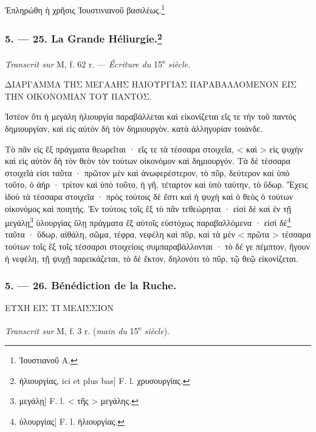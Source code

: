 \documentclass[a4paper, 11pt, oneside, polutonikogreek, french]{article}
\begin{document}
Ἑπληρώθη ἡ χρῆσις Ἰουστινιανοῦ βασιλέως.\footnote{Ἰουστιανοῦ A.}

\bigskip
\centerline{\EightStarTaper}
\centerline{\EightStarTaper\EightStarTaper}
\bigskip

\subsubsection[5. --- 25. La Grande Héliurgie.]{5. --- 25. La Grande Héliurgie.\footnote{ἡλιουργίας, ici et plus bas] F. l. χρυσουργίας.}}

\emph{Transcrit sur} M, f. 62 r. --- \emph{Écriture du} 15\textsuperscript{e} \emph{siècle.}

\bigskip

ΔΙΑΡΓΑΜΜΑ ΤΗΣ ΜΕΓΑΛΗΣ ΗΛΙΟΥΡΓΙΑΣ ΠΑΡΑΒΑΛΛΟΜΕΝΟΝ ΕΙΣ ΤΗΝ ΟΙΚΟΝΟΜΙΑΝ ΤΟΥ ΠΑΝΤΟΣ.

Ἰστέον ὅτι ἡ μεγάλη ἡλιουργία παραβάλλεται καὶ εἰκονίζεται εἴς τε τὴν τοῦ παντὸς δημιουργίαν, καὶ εἰς αὐτὸν δὴ τὸν δημιουργὸν, κατὰ ἀλληγορίαν τοιάνδε.

Τὸ πᾶν εἰς ἓξ πράγματα θεωρεῖται · εἴς τε τὰ τέσσαρα στοιχεῖα, < καὶ > εἰς ψυχὴν καὶ εἰς αὐτὸν δὴ τὸν θεὸν τὸν τούτων οἰκονόμον καὶ δημιουργόν. Τὰ δὲ τέσσαρα στοιχεῖά εἰσι ταῦτα · πρῶτον μὲν καὶ ἀνωφερέστερον, τὸ πῦρ, δεύτερον καὶ ὑπὸ τοῦτο, ὁ ἀήρ · τρίτον καὶ ὑπὸ τοῦτο, ἠ γῆ, τέταρτον καὶ ὑπὸ ταύτην, τὸ ὕδωρ. Ἔχεις ἰδοὺ τὰ τέσσαρα στοιχεῖα · πρὸς τούτοις δὲ ἔστι καὶ ἡ ψυχὴ καὶ ὁ θεὸς ὁ τούτων οἰκονόμος καὶ ποιητής. Ἐν τούτοις τοῖς ἓξ τὸ πᾶν τεθεώρηται · εἰσὶ δὲ καὶ ἐν τῇ μεγάλῃ\footnote{μεγάλῃ] F. l. < τῆς > μεγάλης.} ὑλουργίας ὕλῃ πράγματα ἕξ αὐτοῖς εὐστόχως παραβαλλόμενα · εἰσὶ δὲ\footnote{ὑλουργίας] F. l. ἡλιουργίας.} ταῦτα · ὕδωρ, αἰθάλη, σῶμα, τέφρα, νεφέλη καὶ πῦρ, καὶ τὰ μὲν < πρῶτα > τέσσαρα τούτων τοῖς ἕξ τοῖς τέσσαρσι στοιχείοις συμπαραβάλλονται · τὸ δέ γε πέμπτον, ἤγουν ἡ νεφέλη, τῇ ψυχῇ παρεικάζεται, τὸ δὲ ἕκτον, δηλονότι τὸ πῦρ, τῷ θεῷ εἰκονίζεται.

\bigskip
\centerline{\EightStarTaper}
\centerline{\EightStarTaper\EightStarTaper}
\bigskip

\subsubsection{5. --- 26. Bénédiction de la Ruche.}

ΕΥΧΗ ΕΙΣ ΤΙ ΜΕΛΙΣΣΙΟΝ

\emph{Transcrit sur} M, f. 3 r. (\emph{main du} 15\textsuperscript{e} \emph{siècle}).

\bigskip
\end{document}
